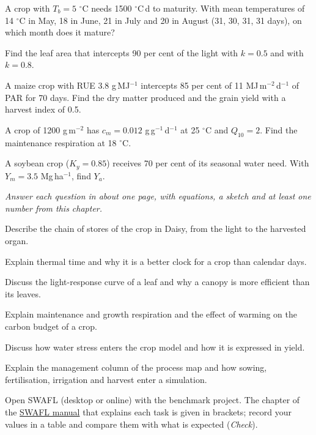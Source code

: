 \begin{exlist}
\item A crop with $T_b=5$ $^\circ$C needs 1500 $^\circ$C\,d to maturity. With mean temperatures of 14 $^\circ$C in May, 18 in June, 21 in July and 20 in August (31, 30, 31, 31 days), on which month does it mature?
\item Find the leaf area that intercepts 90 per cent of the light with $k=0.5$ and with $k=0.8$.
\item A maize crop with RUE 3.8 g\,MJ$^{-1}$ intercepts 85 per cent of 11 MJ\,m$^{-2}$\,d$^{-1}$ of PAR for 70 days. Find the dry matter produced and the grain yield with a harvest index of 0.5.
\item A crop of 1200 g\,m$^{-2}$ has $c_m=0.012$ g\,g$^{-1}$\,d$^{-1}$ at 25 $^\circ$C and $Q_{10}=2$. Find the maintenance respiration at 18 $^\circ$C.
\item A soybean crop ($K_y=0.85$) receives 70 per cent of its seasonal water need. With $Y_m=3.5$ Mg\,ha$^{-1}$, find $Y_a$.
\end{exlist}
{\small\itshape Answer each question in about one page, with equations, a sketch and at least one number from this chapter.}\par\vspace{3pt}
\begin{exlist}
\item Describe the chain of stores of the crop in Daisy, from the light to the harvested organ.
\item Explain thermal time and why it is a better clock for a crop than calendar days.
\item Discuss the light-response curve of a leaf and why a canopy is more efficient than its leaves.
\item Explain maintenance and growth respiration and the effect of warming on the carbon budget of a crop.
\item Discuss how water stress enters the crop model and how it is expressed in yield.
\item Explain the management column of the process map and how sowing, fertilisation, irrigation and harvest enter a simulation.
\end{exlist}
{\small Open SWAFL (desktop or online) with the benchmark project. The chapter of the \href{https://github.com/halilunaziru73-creator/Coupled-Water-Fluxes-Pore-Scale-Dynamics-Precision-Irrigation-Mulching-Feedback-Loops/raw/main/Software/v1.1.0/SWAFL_Desktop/docs/manual_v1.1.0/SWAFL_Manual_v1.1.0.pdf}{SWAFL manual} that explains each task is given in brackets; record your values in a table and compare them with what is expected (\emph{Check}).}\par\vspace{3pt}
